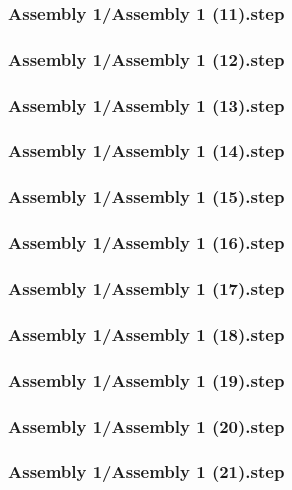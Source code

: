 \documentclass[a4paper,12pt]{article}
\begin{document}
\subsubsection{Assembly 1/Assembly 1 (11).step}

\subsubsection{Assembly 1/Assembly 1 (12).step}

\subsubsection{Assembly 1/Assembly 1 (13).step}

\subsubsection{Assembly 1/Assembly 1 (14).step}

\subsubsection{Assembly 1/Assembly 1 (15).step}

\subsubsection{Assembly 1/Assembly 1 (16).step}

\subsubsection{Assembly 1/Assembly 1 (17).step}

\subsubsection{Assembly 1/Assembly 1 (18).step}

\subsubsection{Assembly 1/Assembly 1 (19).step}

\subsubsection{Assembly 1/Assembly 1 (20).step}

\subsubsection{Assembly 1/Assembly 1 (21).step}

\end{document}
